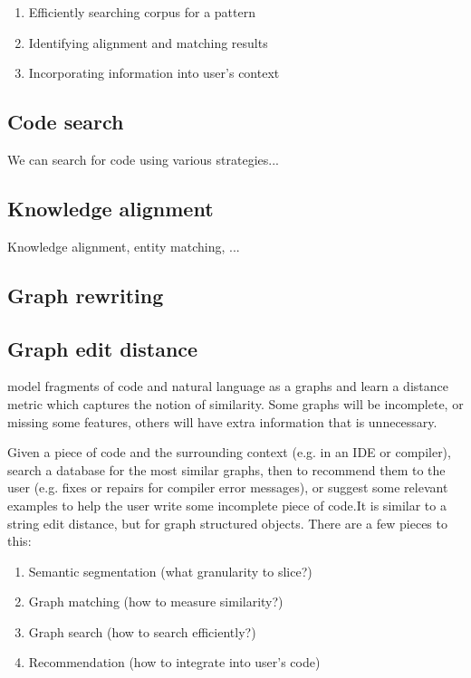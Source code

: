 \documentclass[11pt]{article}
\begin{document}
    \begin{enumerate}
        \item Efficiently searching corpus for a pattern
        \item Identifying alignment and matching results
        \item Incorporating information into user's context
    \end{enumerate}


    \subsection{Code search}

    We can search for code using various strategies...

    \subsection{Knowledge alignment}

    Knowledge alignment, entity matching, ...

    \subsection{Graph rewriting}

    \subsection{Graph edit distance}

    model fragments of code and natural language as a graphs and learn a distance metric which captures the notion of similarity. Some graphs will be incomplete, or missing some features, others will have extra information that is unnecessary.

    Given a piece of code and the surrounding context (e.g. in an IDE or compiler), search a database for the most similar graphs, then to recommend them to the user (e.g. fixes or repairs for compiler error messages), or suggest some relevant examples to help the user write some incomplete piece of code.It is similar to a string edit distance, but for graph structured objects. There are a few pieces to this:

    \begin{enumerate}
    \item Semantic segmentation (what granularity to slice?)
    \item Graph matching (how to measure similarity?)
    \item Graph search (how to search efficiently?)
    \item Recommendation (how to integrate into user's code)
    \end{enumerate}
\end{document}
